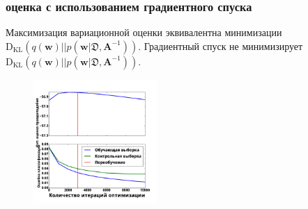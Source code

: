 \documentclass[11pt,pdf,utf8,russian,aspectratio=169]{beamer}
\begin{document}
\begin{frame}
\frametitle{ оценка с использованием градиентного спуска}
Максимизация вариационной оценки эквивалентна минимизации $\text{D}_{\text{KL}}(q(\mathbf{w})||p(\mathbf{w} | \mathfrak{D},\mathbf{A}^{-1}))$.
Градиентный спуск не минимизирует $\text{D}_{\text{KL}}(q(\mathbf{w})||p(\mathbf{w} | \mathfrak{D},\mathbf{A}^{-1}))$.
\begin{multicols}{2}

\begin{figure}
\end{figure}

\columnbreak


\begin{figure}
{\includegraphics[width=0.42\textwidth]{./slide_plots/sgd_show.pdf}}
\end{figure}
\end{multicols}
\end{frame}

                                                                                                                                  
                                                                                                                                                
\end{document}
